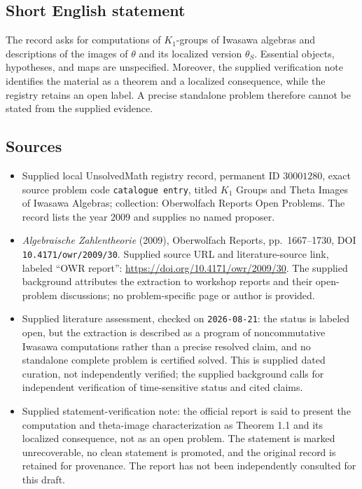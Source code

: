 \documentclass[11pt]{article}
\begin{document}
\subsection{Short English statement}
The record asks for computations of \(K_1\)-groups of Iwasawa algebras and descriptions of the images of \(\theta\) and its localized version \(\theta_S\). Essential objects, hypotheses, and maps are unspecified. Moreover, the supplied verification note identifies the material as a theorem and a localized consequence, while the registry retains an open label. A precise standalone problem therefore cannot be stated from the supplied evidence.
\subsection{Sources}
\begin{itemize}
\item Supplied local UnsolvedMath registry record, permanent ID \(30001280\), exact source problem code \texttt{catalogue entry}, titled \(K_1\) Groups and Theta Images of Iwasawa Algebras; collection: Oberwolfach Reports Open Problems. The record lists the year 2009 and supplies no named proposer.
\item \emph{Algebraische Zahlentheorie} (2009), Oberwolfach Reports, pp.\ 1667--1730, DOI \texttt{10.4171/owr/2009/30}. Supplied source URL and literature-source link, labeled ``OWR report'': \url{https://doi.org/10.4171/owr/2009/30}. The supplied background attributes the extraction to workshop reports and their open-problem discussions; no problem-specific page or author is provided.
\item Supplied literature assessment, checked on \texttt{2026-08-21}: the status is labeled open, but the extraction is described as a program of noncommutative Iwasawa computations rather than a precise resolved claim, and no standalone complete problem is certified solved. This is supplied dated curation, not independently verified; the supplied background calls for independent verification of time-sensitive status and cited claims.
\item Supplied statement-verification note: the official report is said to present the computation and theta-image characterization as Theorem 1.1 and its localized consequence, not as an open problem. The statement is marked unrecoverable, no clean statement is promoted, and the original record is retained for provenance. The report has not been independently consulted for this draft.
\end{itemize}
\end{document}
